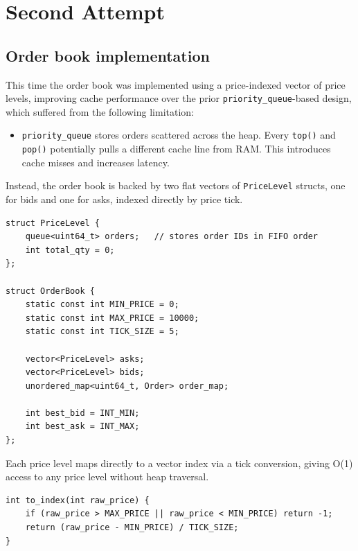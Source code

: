 \documentclass[11pt,a4paper]{article}
\begin{document}
\section{Second Attempt}\label{sec:second}

\subsection{Order book implementation}

This time the order book was implemented using a price-indexed vector of
price levels, improving cache performance over the prior
\texttt{priority\_queue}-based design, which suffered from the following
limitation:

\begin{itemize}
\item \texttt{priority\_queue} stores orders scattered across the heap.
      Every \texttt{top()} and \texttt{pop()} potentially pulls a different
      cache line from RAM. This introduces cache misses and increases
      latency.
\end{itemize}

Instead, the order book is backed by two flat vectors of
\texttt{PriceLevel} structs, one for bids and one for asks, indexed directly
by price tick.

\begin{lstlisting}[caption={Order book data structures (phase 2)}]
struct PriceLevel {
    queue<uint64_t> orders;   // stores order IDs in FIFO order
    int total_qty = 0;
};

struct OrderBook {
    static const int MIN_PRICE = 0;
    static const int MAX_PRICE = 10000;
    static const int TICK_SIZE = 5;

    vector<PriceLevel> asks;
    vector<PriceLevel> bids;
    unordered_map<uint64_t, Order> order_map;

    int best_bid = INT_MIN;
    int best_ask = INT_MAX;
};
\end{lstlisting}

Each price level maps directly to a vector index via a tick conversion,
giving O(1) access to any price level without heap traversal.

\begin{lstlisting}[caption={Price to index conversion}]
int to_index(int raw_price) {
    if (raw_price > MAX_PRICE || raw_price < MIN_PRICE) return -1;
    return (raw_price - MIN_PRICE) / TICK_SIZE;
}
\end{lstlisting}
\end{document}
